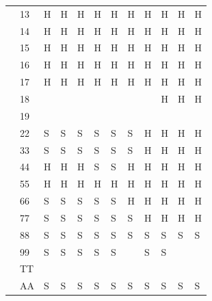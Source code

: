 \documentclass[letterpaper]{article}
\begin{document}
{\begin{minipage}[t][81mm][t]{49.5mm}
\begin{tabular}{C{2.4mm}|C{6.4mm}|C{2.9mm}C{2.9mm}C{2.9mm}C{2.9mm}C{2.9mm}C{2.9mm}C{2.9mm}C{2.9mm}C{2.9mm}C{2.9mm}}
             & 13   & H & H & H & H & H & H & H & H & H & H \\
            & 14   & H & H & H & H & H & H & H & H & H & H \\
            & 15   & H & H & H & H & H & H & H & H & H & H \\
            & 16   & H & H & H & H & H & H & H & H & H & H \\
            & 17   & H & H & H & H & H & H & H & H & H & H \\
            & 18   &  &  &  &  &  &  &  & H & H & H \\
            & 19   &  &  &  &  &  &  &  &  &  &  \\ \hline
             & 22   & S & S & S & S & S & S & H & H & H & H \\
            & 33   & S & S & S & S & S & S & H & H & H & H \\
            & 44   & H & H & H & S & S & H & H & H & H & H \\
            & 55   & H & H & H & H & H & H & H & H & H & H \\
            & 66   & S & S & S & S & S & H & H & H & H & H \\
            & 77   & S & S & S & S & S & S & H & H & H & H \\
            & 88   & S & S & S & S & S & S & S & S & S & S \\
            & 99   & S & S & S & S & S &  & S & S &  &  \\
            & TT   &  &  &  &  &  &  &  &  &  &  \\
            & AA   & S & S & S & S & S & S & S & S & S & S \\
        \end{tabular}\\


\end{minipage}}
\end{document}
